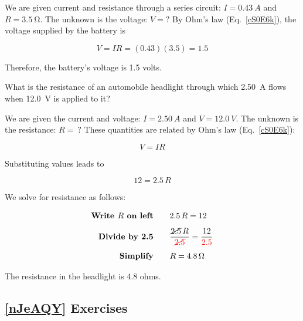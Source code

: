 \documentclass[main.tex]{subfiles}
\begin{document}
We are given current and resistance through a series circuit: $I = \SI{0.43}{A}$ and $R = \qty{3.5}{\ohm}$. The unknown is the voltage: $V = \text{?}$ By Ohm's law (Eq.~\ref{cS0E6k}), the voltage supplied by the battery is

\begin{equation*}
    V = I R = (0.43)(3.5) = 1.5
\end{equation*}

Therefore, the battery's voltage is 1.5 volts.

\vspace{1em}

\cyanhrule

\clearpage
\begin{example}
    What is the resistance of an automobile headlight through which \SI{2.50}{A} flows when \SI{12.0}{V} is applied to it?
\end{example}

\Solution We are given the current and voltage: $I = \SI{2.50}{A}$ and $V = \SI{12.0}{V}$. The unknown is the resistance: $R =\ ?$ These quantities are related by Ohm's law (Eq.~\ref{cS0E6k}):

\begin{equation*}
    V = IR
\end{equation*}

Substituting values leads to

\begin{equation*}
    12 = 2.5\,R
\end{equation*}

We solve for resistance as follows:

\begin{align*}
    \textbf{Write $R$ on left} \qquad & 2.5\,R = 12 \\[1ex]
    \textbf{Divide by 2.5} \qquad & \frac{\cancel{2.5}\,R}{\textcolor{red}{\cancel{2.5}}} = \frac{12}{\textcolor{red}{2.5}}\\[1ex]
    \textbf{Simplify} \qquad & R = \SI{4.8}{\ohm}
\end{align*}

The resistance in the headlight is 4.8 ohms.

\vspace{1em}

\cyanhrule

\subsection*{\ref{nJeAQY} Exercises}
\end{document}
